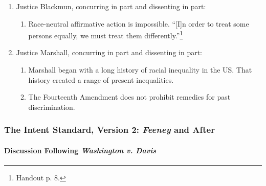 \begin{enumerate}
    \item Justice Blackmun, concurring in part and dissenting in part:
    \begin{enumerate}
        \item Race-neutral affirmative action is impossible. ``[I]n order to 
        treat some persons equally, we must treat them 
        differently.''\footnote{Handout p. 8.}
    \end{enumerate}
    \item Justice Marshall, concurring in part and dissenting in part:
    \begin{enumerate}
        \item Marshall began with a long history of racial inequality in the 
        US. That history created a range of present inequalities.
        \item The Fourteenth Amendment does not prohibit remedies for past 
        discrimination.
    \end{enumerate}
\end{enumerate}

% 
% 
% 
% 
\subsubsection{The Intent Standard, Version 2: \emph{Feeney} and After}

\paragraph{Discussion Following \emph{Washington v. Davis}}


